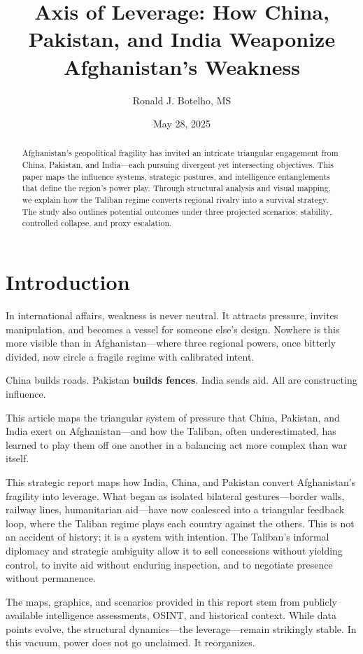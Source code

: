 \documentclass[11pt]{article}
\title{Axis of Leverage: How China, Pakistan, and India Weaponize Afghanistan’s Weakness}
\author{Ronald J. Botelho, MS}
\date{May 28, 2025}
\begin{document}
\maketitle

\begin{abstract}
Afghanistan’s geopolitical fragility has invited an intricate triangular engagement from China, Pakistan, and India—each pursuing divergent yet intersecting objectives. This paper maps the influence systems, strategic postures, and intelligence entanglements that define the region’s power play. Through structural analysis and visual mapping, we explain how the Taliban regime converts regional rivalry into a survival strategy. The study also outlines potential outcomes under three projected scenarios: stability, controlled collapse, and proxy escalation.
\end{abstract}

\newpage


\section*{Introduction}
In international affairs, weakness is never neutral. It attracts pressure, invites manipulation, and becomes a vessel for someone else’s design. Nowhere is this more visible than in Afghanistan—where three regional powers, once bitterly divided, now circle a fragile regime with calibrated intent.

China builds roads. Pakistan \textbf{builds fences}. India sends aid. All are constructing influence.

This article maps the triangular system of pressure that China, Pakistan, and India exert on Afghanistan—and how the Taliban, often underestimated, has learned to play them off one another in a balancing act more complex than war itself.

\begin{small}
This strategic report maps how India, China, and Pakistan convert Afghanistan's fragility into leverage. What began as isolated bilateral gestures—border walls, railway lines, humanitarian aid—have now coalesced into a triangular feedback loop, where the Taliban regime plays each country against the others. This is not an accident of history; it is a system with intention. The Taliban’s informal diplomacy and strategic ambiguity allow it to sell concessions without yielding control, to invite aid without enduring inspection, and to negotiate presence without permanence.

The maps, graphics, and scenarios provided in this report stem from publicly available intelligence assessments, OSINT, and historical context. While data points evolve, the structural dynamics—the leverage—remain strikingly stable. In this vacuum, power does not go unclaimed. It reorganizes.
\end{small}
\end{document}
